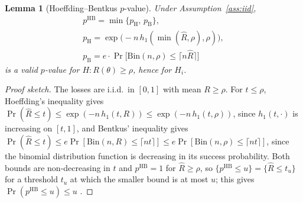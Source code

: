 \documentclass[3p,twocolumn,10pt]{elsarticle}
\newtheorem{lemma}{Lemma}
\theoremstyle{definition}
\begin{document}
\begin{lemma}[Hoeffding--Bentkus $p$-value]
\label{lem:hb}
Under Assumption~\ref{ass:iid},
\begin{equation}
\begin{gathered}
p^{\mathrm{HB}}=\min\{p_{\mathrm{H}},\,p_{\mathrm{B}}\},\\
p_{\mathrm{H}}=\exp\!\big(-n\,h_1(\min(\hat R,\rho),\rho)\big),\\
p_{\mathrm{B}}=e\cdot\Pr\big[\mathrm{Bin}(n,\rho)\le\lceil n\hat R\rceil\big]
\end{gathered}
\label{eq:hb}
\end{equation}
is a valid $p$-value for $H:R(\theta)\ge\rho$, hence for $H_i$.
\end{lemma}
\begin{proof}[Proof sketch]
The losses are i.i.d.\ in $[0,1]$ with mean $R\ge\rho$. For $t\le\rho$, Hoeffding's inequality \citep{hoeffding1963probability} gives $\Pr(\hat R\le t)\le\exp(-n\,h_1(t,R))\le\exp(-n\,h_1(t,\rho))$, since $h_1(t,\cdot)$ is increasing on $[t,1]$, and Bentkus' inequality \citep{bentkus2004hoeffding} gives $\Pr(\hat R\le t)\le e\Pr[\mathrm{Bin}(n,R)\le\lceil nt\rceil]\le e\Pr[\mathrm{Bin}(n,\rho)\le\lceil nt\rceil]$, since the binomial distribution function is decreasing in its success probability. Both bounds are non-decreasing in $t$ and $p^{\mathrm{HB}}=1$ for $\hat R\ge\rho$, so $\{p^{\mathrm{HB}}\le u\}=\{\hat R\le t_u\}$ for a threshold $t_u$ at which the smaller bound is at most $u$; this gives $\Pr(p^{\mathrm{HB}}\le u)\le u$ \citep{bates2021rcps}.
\end{proof}
\end{document}
